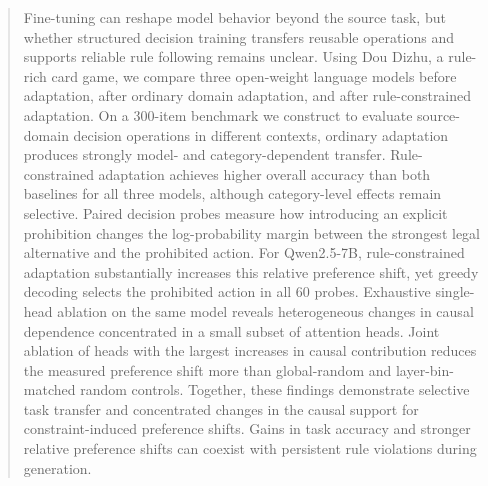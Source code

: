 \begin{abstract}

Fine-tuning can reshape model behavior beyond the source task, but whether structured decision training transfers reusable operations and supports reliable rule following remains unclear. Using Dou Dizhu, a rule-rich card game, we compare three open-weight language models before adaptation, after ordinary domain adaptation, and after rule-constrained adaptation. On a 300-item benchmark we construct to evaluate source-domain decision operations in different contexts, ordinary adaptation produces strongly model- and category-dependent transfer. Rule-constrained adaptation achieves higher overall accuracy than both baselines for all three models, although category-level effects remain selective. Paired decision probes measure how introducing an explicit prohibition changes the log-probability margin between the strongest legal alternative and the prohibited action. For Qwen2.5-7B, rule-constrained adaptation substantially increases this relative preference shift, yet greedy decoding selects the prohibited action in all 60 probes. Exhaustive single-head ablation on the same model reveals heterogeneous changes in causal dependence concentrated in a small subset of attention heads. Joint ablation of heads with the largest increases in causal contribution reduces the measured preference shift more than global-random and layer-bin-matched random controls. Together, these findings demonstrate selective task transfer and concentrated changes in the causal support for constraint-induced preference shifts. Gains in task accuracy and stronger relative preference shifts can coexist with persistent rule violations during generation.

\end{abstract}
